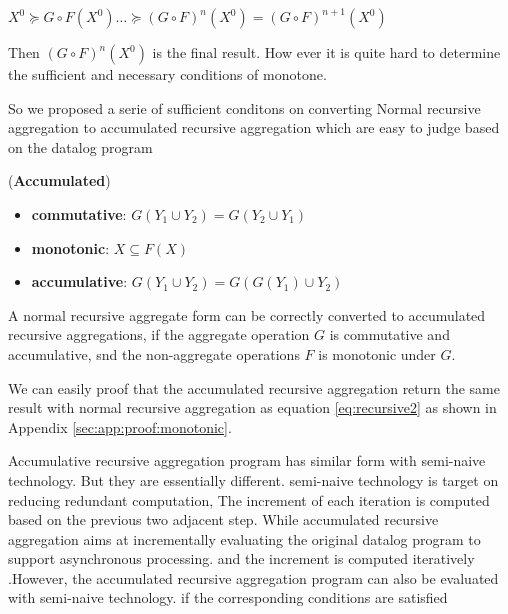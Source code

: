{{$X^0\succeq G\circ F(X^{0})\ldots \succeq (G\circ F)^n(X^{0})= (G\circ F)^{n+1}(X^{0})$

Then $(G\circ F)^{n}(X^{0})$ is the final result\cite{Lam:2013:SDE:2510649.2511289,Wang:2015:AFR:2824032.2824052}. How ever it is quite hard to determine the sufficient and necessary conditions of monotone.
}
So we proposed a serie of sufficient conditons on converting Normal recursive aggregation to accumulated recursive aggregation which are easy to judge based on the datalog program
	\begin{definition}
		\label{th:monotone}
		(\textbf{Accumulated}) 
		\begin{itemize}
			\item \textbf{commutative}: $G(Y_1\cup Y_2)=G(Y_2\cup Y_1)$
			\item \textbf{monotonic}: $X\subseteq F(X)$
			\item \textbf{accumulative}: $G(Y_1\cup Y_2)=G(G(Y_1)\cup Y_2)$
		\end{itemize}
		A normal recursive aggregate form can be correctly converted to accumulated recursive aggregations, if the aggregate operation $G$ is commutative and accumulative, snd the non-aggregate operations $F$ is monotonic under $G$.
		
		We can easily proof that the accumulated recursive aggregation return the same result with normal recursive aggregation as equation \ref{eq:recursive2} as shown in Appendix \ref{sec:app:proof:monotonic}.
	\end{definition}
	
	{\color{red}
		Accumulative recursive aggregation program has similar form with semi-naive technology. But they are essentially different.
		semi-naive technology is target on reducing redundant computation, The increment of each iteration is computed based on the previous two adjacent step. While accumulated recursive aggregation aims at incrementally evaluating the original datalog program to support asynchronous processing. and the increment is computed iteratively .However, the accumulated recursive aggregation program can also be evaluated with semi-naive technology. if the corresponding conditions are satisfied
	}
	
	
}
